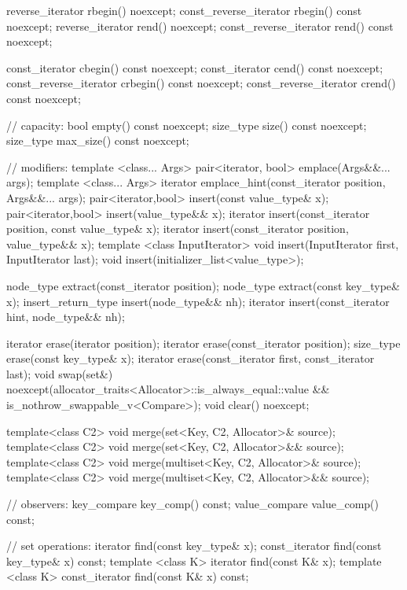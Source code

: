 \begin{codeblock}
{{    reverse_iterator       rbegin() noexcept;
    const_reverse_iterator rbegin() const noexcept;
    reverse_iterator       rend() noexcept;
    const_reverse_iterator rend() const noexcept;

    const_iterator         cbegin() const noexcept;
    const_iterator         cend() const noexcept;
    const_reverse_iterator crbegin() const noexcept;
    const_reverse_iterator crend() const noexcept;

    // capacity:
    bool      empty() const noexcept;
    size_type size() const noexcept;
    size_type max_size() const noexcept;

    // modifiers:
    template <class... Args> pair<iterator, bool> emplace(Args&&... args);
    template <class... Args> iterator emplace_hint(const_iterator position, Args&&... args);
    pair<iterator,bool> insert(const value_type& x);
    pair<iterator,bool> insert(value_type&& x);
    iterator insert(const_iterator position, const value_type& x);
    iterator insert(const_iterator position, value_type&& x);
    template <class InputIterator>
      void insert(InputIterator first, InputIterator last);
    void insert(initializer_list<value_type>);

    node_type extract(const_iterator position);
    node_type extract(const key_type& x);
    insert_return_type insert(node_type&& nh);
    iterator           insert(const_iterator hint, node_type&& nh);

    iterator  erase(iterator position);
    iterator  erase(const_iterator position);
    size_type erase(const key_type& x);
    iterator  erase(const_iterator first, const_iterator last);
    void      swap(set&)
      noexcept(allocator_traits<Allocator>::is_always_equal::value &&
               is_nothrow_swappable_v<Compare>);
    void      clear() noexcept;

    template<class C2>
      void merge(set<Key, C2, Allocator>& source);
    template<class C2>
      void merge(set<Key, C2, Allocator>&& source);
    template<class C2>
      void merge(multiset<Key, C2, Allocator>& source);
    template<class C2>
      void merge(multiset<Key, C2, Allocator>&& source);

    // observers:
    key_compare key_comp() const;
    value_compare value_comp() const;

    // set operations:
    iterator       find(const key_type& x);
    const_iterator find(const key_type& x) const;
    template <class K> iterator       find(const K& x);
    template <class K> const_iterator find(const K& x) const;

}}
\end{codeblock}
